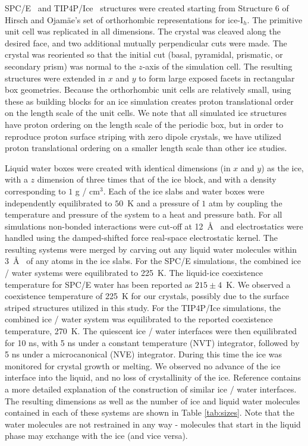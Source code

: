 SPC/E~\cite{Berendsen1987} and TIP4P/Ice~\cite{Abascal2005} structures
were created starting from Structure 6 of Hirsch and Ojam\"{a}e's set
of orthorhombic representations for ice-I$_{h}$.\cite{Hirsch2004} The
primitive unit cell was replicated in all dimensions. The crystal was
cleaved along the desired face, and two additional mutually
perpendicular cuts were made.  The crystal was reoriented so that the
initial cut (basal, pyramidal, prismatic, or secondary prism) was
normal to the $z$-axis of the simulation cell.  The resulting
structures were extended in $x$ and $y$ to form large exposed facets
in rectangular box geometries.  Because the orthorhombic unit cells
are relatively small, using these as building blocks for an ice
simulation creates proton translational order on the length scale of
the unit cells. We note that all simulated ice structures have proton
ordering on the length scale of the periodic box, but in order to
reproduce proton surface striping with zero dipole crystals, we have
utilized proton translational ordering on a smaller length scale than
other ice studies.

Liquid water boxes were created with identical dimensions (in $x$ and
$y$) as the ice, with a $z$ dimension of three times that of the ice
block, and with a density corresponding to $1$ g / cm$^3$.  Each of
the ice slabs and water boxes were independently equilibrated to
$50$~K and a pressure of $1$ atm by coupling the temperature and
pressure of the system to a heat and pressure bath. For all
simulations non-bonded interactions were cut-off at 12~\AA~ and
electrostatics were handled using the damped-shifted force real-space
electrostatic kernel.\cite{Fennell2006} The resulting systems were
merged by carving out any liquid water molecules within 3~\AA~ of any
atoms in the ice slabs.  For the SPC/E simulations, the combined ice /
water systems were equilibrated to 225~K. The liquid-ice coexistence
temperature for SPC/E water has been reported as
$215 \pm 4$~K.\cite{Vega2006a,Fernandez2006} We observed a coexistence
temperature of 225~K for our crystals, possibly due to the surface
striped structures utilized in this study. For the TIP4P/Ice
simulations, the combined ice / water system was equilibrated to the
reported coexistence temperature, 270~K.\cite{Vega2006a,Fernandez2006}
The quiescent ice / water interfaces were then equilibrated for 10 ns,
with 5 ns under a constant temperature (NVT) integrator, followed by 5
ns under a microcanonical (NVE) integrator.  During this time the ice
was monitored for crystal growth or melting. We observed no advance of
the ice interface into the liquid, and no loss of crystallinity of the
ice. Reference  contains a more detailed
explanation of the construction of similar ice / water interfaces. The
resulting dimensions as well as the number of ice and liquid water
molecules contained in each of these systems are shown in Table
\ref{tab:sizes}.  Note that the water molecules are not restrained in
any way - molecules that start in the liquid phase may exchange with
the ice (and vice versa).

